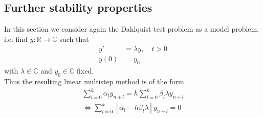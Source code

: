 	
	
	
	
	\subsection{Further stability properties}
	
	In this section we consider again the Dahlquist test problem as a model problem, i.e. find $y:\mathbb{R} \to \mathbb{C}$ such that
	\begin{align}
		y' &= \lambda y, \quad t > 0 \\
		y(0) &= y_0
	\end{align}
	with $\lambda \in \mathbb{C}$ and $y_0 \in \mathbb{C}$ fixed.\\
	
	
	Thus the resulting linear multistep method is of the form
	\begin{align*}
		\sum_{l=0}^{k} \alpha_l y_{n+l} = h \sum_{l=0}^{k} \beta_l \lambda y_{n+l} \\
		\iff \sum_{l=0}^{k}  [\alpha_l - h \beta_l \lambda] y_{n+l} = 0
	\end{align*}
	
	
